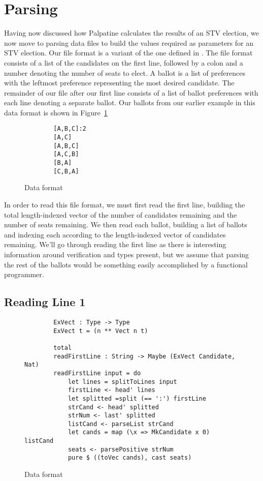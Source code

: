 \section{Parsing}

Having now discussed how Palpatine calculates the results of an STV election, we
now move to parsing data files to build the values required as parameters for an
STV election. Our file format is a variant of the one defined in
\cite{stv_haskell}. The file format consists of a list of the candidates on the
first line, followed by a colon and a number denoting the number of seats to
elect. A ballot is a list of preferences with the leftmost preference
representing the most desired candidate. The remainder of our file after our
first line consists of a list of ballot preferences with each line denoting a
separate ballot. Our ballots from our earlier example in this data format is
shown in Figure~\ref{stv_format}

\begin{figure}[ht!!!!!!!]
    \caption{Data format}
    \label{stv_format}
    \begin{lstlisting}
        [A,B,C]:2
        [A,C]
        [A,B,C]
        [A,C,B]
        [B,A]
        [C,B,A]
    \end{lstlisting}
\end{figure}

In order to read this file format, we must first read the first line, building
the total length-indexed vector of the number of candidates remaining and the
number of seats remaining. We then read each ballot, building a list of ballots
and indexing each according to the length-indexed vector of candidates
remaining. We'll go through reading the first line as there is interesting
information around verification and types present, but we assume that parsing
the rest of the ballots would be something easily accomplished by a functional
programmer. 

\subsection{Reading Line 1}

\begin{figure}[ht!!!!!!!]
    \caption{Data format}
    \label{read_first_line_code}
    \begin{lstlisting}
        ExVect : Type -> Type
        ExVect t = (n ** Vect n t)

        total
        readFirstLine : String -> Maybe (ExVect Candidate, Nat)
        readFirstLine input = do
            let lines = splitToLines input
            firstLine <- head' lines
            let splitted =split (== ':') firstLine
            strCand <- head' splitted
            strNum <- last' splitted
            listCand <- parseList strCand
            let cands = map (\x => MkCandidate x 0) listCand
            seats <- parsePositive strNum
            pure $ ((toVec cands), cast seats)
    \end{lstlisting}
\end{figure}

